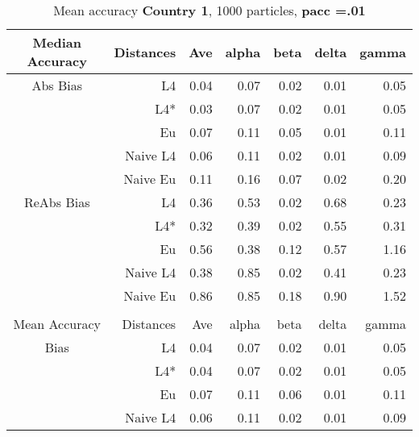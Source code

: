 \documentclass[a4paper,12pt,twoside]{book}
\begin{document}
\begin{table}[H]

\centering
\vfill
\vspace{2cm}
\caption{Mean  accuracy \textbf{Country 1}, 1000 particles, \textbf{pacc =.01}}


\begin{tabular}{crrrrrr}

  \hline
  
{\color{blue}Median Accuracy} & Distances & Ave & alpha & beta & delta & gamma \\ 
  \hline
{\color{blue}Abs Bias} & L4  &0.04 & 0.07 & 0.02 & 0.01 & 0.05 \\ 
  
&L4*  &0.03 & 0.07 & 0.02 & 0.01 & 0.05 \\ 
  
&Eu &  0.07 & 0.11 & 0.05 & 0.01 & 0.11 \\ 
  
&Naive L4&      0.06 & 0.11 & 0.02 & 0.01 & 0.09 \\ 
  
&Naive Eu &  0.11 & 0.16 & 0.07 & 0.02 & 0.20 \\ 
 
   \hline
   
{\color{blue} ReAbs Bias } & L4  & 0.36 & 0.53 & 0.02 & 0.68 & 0.23 \\ 
  
&L4*  &0.32 & 0.39 & 0.02 & 0.55 & 0.31 \\ 
  
&Eu &   
  0.56 & 0.38 & 0.12 & 0.57 & 1.16 \\ 
  
  
&Naive L4&   
  0.38 & 0.85 & 0.02 & 0.41 & 0.23 \\ 
&Naive Eu &   0.86 & 0.85 & 0.18 & 0.90 & 1.52 \\\\
   \hline
{\color{blue}Mean Accuracy} & Distances & Ave & alpha & beta & delta & gamma \\ 
  \hline
{\color{blue}Bias} & L4  &0.04 & 0.07 & 0.02 & 0.01 & 0.05 \\ 
 
&L4*  &  0.04 & 0.07 & 0.02 & 0.01 & 0.05 \\ 
  
  
&Eu &   0.07 & 0.11 & 0.06 & 0.01 & 0.11 \\ 
  
&Naive L4&  
 0.06 & 0.11 & 0.02 & 0.01 & 0.09 \\ 
   

\end{tabular}
\end{table}
\end{document}
